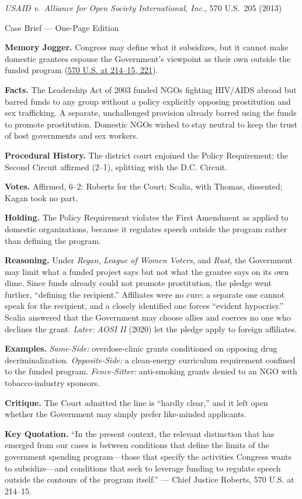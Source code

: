 \documentclass[12pt]{article}
\begin{document}
\begin{center}
{\Large \textit{USAID v.\ Alliance for Open Society International, Inc.}, 570 U.S.\ 205 (2013)\par}
\vspace{0.3em}
{\normalsize Case Brief --- One-Page Edition\par}
\end{center}

\textbf{Memory Jogger.} Congress may define what it subsidizes, but it cannot make domestic grantees espouse the Government's viewpoint as their own outside the funded program (\href{https://supreme.justia.com/cases/federal/us/570/205/}{570 U.S. at 214--15, 221}).

\textbf{Facts.} The Leadership Act of 2003 funded NGOs fighting HIV/AIDS abroad but barred funds to any group without a policy explicitly opposing prostitution and sex trafficking. A separate, unchallenged provision already barred using the funds to promote prostitution. Domestic NGOs wished to stay neutral to keep the trust of host governments and sex workers.

\textbf{Procedural History.} The district court enjoined the Policy Requirement; the Second Circuit affirmed (2--1), splitting with the D.C. Circuit.

\textbf{Votes.} Affirmed, 6--2: Roberts for the Court; Scalia, with Thomas, dissented; Kagan took no part.

\textbf{Holding.} The Policy Requirement violates the First Amendment as applied to domestic organizations, because it regulates speech outside the program rather than defining the program.

\textbf{Reasoning.} Under \textit{Regan}, \textit{League of Women Voters}, and \textit{Rust}, the Government may limit what a funded project says but not what the grantee says on its own dime. Since funds already could not promote prostitution, the pledge went further, ``defining the recipient.'' Affiliates were no cure: a separate one cannot speak for the recipient, and a closely identified one forces ``evident hypocrisy.'' Scalia answered that the Government may choose allies and coerces no one who declines the grant. \emph{Later:} \textit{AOSI II} (2020) let the pledge apply to foreign affiliates.

\textbf{Examples.} \emph{Same-Side:} overdose-clinic grants conditioned on opposing drug decriminalization. \emph{Opposite-Side:} a clean-energy curriculum requirement confined to the funded program. \emph{Fence-Sitter:} anti-smoking grants denied to an NGO with tobacco-industry sponsors.

\textbf{Critique.} The Court admitted the line is ``hardly clear,'' and it left open whether the Government may simply prefer like-minded applicants.

\textbf{Key Quotation.} ``In the present context, the relevant distinction that has emerged from our cases is between conditions that define the limits of the government spending program---those that specify the activities Congress wants to subsidize---and conditions that seek to leverage funding to regulate speech outside the contours of the program itself.'' --- Chief Justice Roberts, 570 U.S. at 214--15.
\end{document}
